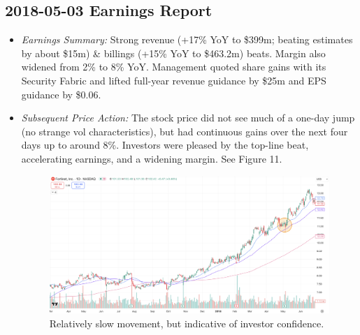 \documentclass[11pt]{article}
\begin{document}
    \subsection{2018-05-03 Earnings Report}
        \begin{itemize}
            \item \textit{Earnings Summary:} Strong revenue (+17\% YoY to \$399m; beating estimates by about \$15m) \& billings (+15\% YoY to \$463.2m) beats. Margin also widened from 2\% to 8\% YoY. Management quoted share gains with its Security Fabric and lifted full-year revenue guidance by \$25m and EPS guidance by \$0.06.
            \item \textit{Subsequent Price Action:} The stock price did not see much of a one-day jump (no strange vol characteristics), but had continuous gains over the next four days up to around 8\%. Investors were pleased by the top-line beat, accelerating earnings, and a widening margin. See Figure 11.
            \begin{figure}[h]
                \centering \includegraphics[width=0.8\linewidth]{images/FTNT1.png}
                \caption{Relatively slow movement, but indicative of investor confidence.}
            \end{figure}
        \end{itemize}
\end{document}

